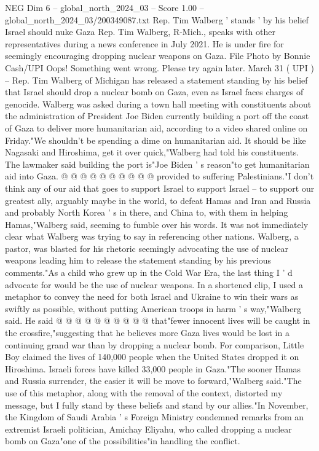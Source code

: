 \begin{textsample}{NEG Dim 6 – global\_north\_2024\_03 – Score 1.00 – global\_north\_2024\_03/200349087.txt}  \label{ex:f6_neg_400}
Rep.
Tim Walberg ' stands ' by his belief Israel should nuke Gaza Rep.
Tim Walberg, R-Mich., speaks with other representatives during a news conference in July 2021.
He is under fire for seemingly encouraging dropping nuclear weapons on Gaza.
File Photo by Bonnie Cash/UPI Oops!
Something went wrong.
Please try again later.
March 31 ( UPI ) -- Rep.
Tim Walberg of Michigan has released a statement standing by his belief that Israel should drop a nuclear bomb on Gaza, even as Israel faces charges of genocide.
Walberg was asked during a town hall meeting with constituents about the administration of President Joe Biden currently building a port off the coast of Gaza to deliver more humanitarian aid, according to a video shared online on Friday."We shouldn't be spending a dime on humanitarian aid.
It should be like Nagasaki and Hiroshima, get it over quick,"Walberg had told his constituents.
The lawmaker said building the port is"Joe Biden ' s reason"to get humanitarian aid into Gaza. @ @ @ @ @ @ @ @ @ @ provided to suffering Palestinians."I don't think any of our aid that goes to support Israel to support Israel -- to support our greatest ally, arguably maybe in the world, to defeat Hamas and Iran and Russia and probably North Korea ' s in there, and China to, with them in helping Hamas,"Walberg said, seeming to fumble over his words.
It was not immediately clear what Walberg was trying to say in referencing other nations.
Walberg, a pastor, was blasted for his rhetoric seemingly advocating the use of nuclear weapons leading him to release the statement standing by his previous comments."As a child who grew up in the Cold War Era, the last thing I ' d advocate for would be the use of nuclear weapons.
In a shortened clip, I used a metaphor to convey the need for both Israel and Ukraine to win their wars as swiftly as possible, without putting American troops in harm ' s way,"Walberg said.
He said @ @ @ @ @ @ @ @ @ @ that"fewer innocent lives will be caught in the crossfire,"suggesting that he believes more Gaza lives would be lost in a continuing grand war than by dropping a nuclear bomb.
For comparison, Little Boy claimed the lives of 140,000 people when the United States dropped it on Hiroshima.
Israeli forces have killed 33,000 people in Gaza."The sooner Hamas and Russia surrender, the easier it will be move to forward,"Walberg said."The use of this metaphor, along with the removal of the context, distorted my message, but I fully stand by these beliefs and stand by our allies."In November, the Kingdom of Saudi Arabia ' s Foreign Ministry condemned remarks from an extremist Israeli politician, Amichay Eliyahu, who called dropping a nuclear bomb on Gaza"one of the possibilities"in handling the conflict.

\end{textsample}
